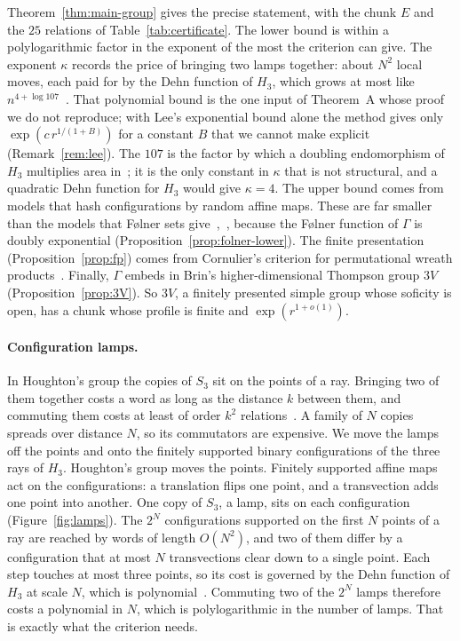 Theorem~\ref{thm:main-group} gives the precise statement, with the chunk $E$ and the $25$ relations of Table~\ref{tab:certificate}. The lower
bound is within a polylogarithmic factor in the exponent of the most the criterion can give. The exponent $\kappa$ records the price of bringing
two lamps together: about $N^2$ local moves, each paid for by the Dehn function of $H_3$, which grows at most like $n^{4+\log107}$~\cite[Theorems~3.2 and~3.3]{DouglasMghirbiA}. That
polynomial bound is the one input of Theorem~A whose proof we do not reproduce; with Lee's exponential bound alone the method gives only
$\exp(c\,r^{1/(1+B)})$ for a constant $B$ that we cannot make explicit (Remark~\ref{rem:lee}). The $107$ is
the factor by which a doubling endomorphism of $H_3$ multiplies area in~\cite[Section~3]{DouglasMghirbiA}; it is the only constant in $\kappa$
that is not structural, and a quadratic Dehn function for $H_3$ would give $\kappa=4$. The upper bound comes from models that hash
configurations by random affine maps. These are far smaller than the models that Følner sets give~\cite[Proposition~3.14]{Cornulier2013},~\cite[Section~4.3]{ArzhantsevaCherix2024},
because the Følner function of $\Gamma$ is doubly exponential (Proposition~\ref{prop:folner-lower}). The finite presentation
(Proposition~\ref{prop:fp}) comes from Cornulier's criterion for permutational wreath products~\cite[Theorem~1.1]{Cornulier2006}. Finally,
$\Gamma$ embeds in Brin's higher-dimensional Thompson group $3V$ (Proposition~\ref{prop:3V}). So $3V$, a finitely presented simple group whose
soficity is open, has a chunk whose profile is finite and $\exp(r^{1+o(1)})$.

\paragraph{Configuration lamps.} In Houghton's group the copies of $S_3$ sit on the points of a ray. Bringing two of them together costs a
word as long as the distance $k$ between them, and commuting them costs at least of order $k^2$ relations~\cite[Proposition~3.4]{DouglasMghirbiA}.
A family of $N$ copies spreads over distance $N$, so its commutators are expensive. We move the lamps off the points and onto the finitely
supported binary configurations of the three rays of $H_3$. Houghton's group moves the points. Finitely supported affine maps act on the
configurations: a translation flips one point, and a transvection adds one point into another. One copy of $S_3$, a lamp, sits on each
configuration (Figure~\ref{fig:lamps}). The $2^N$ configurations supported on the first $N$ points of a ray are reached by words of length
$O(N^2)$, and two of them differ by a configuration that at most $N$ transvections clear down to a single point. Each step touches at most
three points, so its cost is governed by the Dehn function of $H_3$ at scale $N$, which is polynomial~\cite[Theorems~3.2 and~3.3]{DouglasMghirbiA}.
Commuting two of the $2^N$ lamps therefore costs a polynomial in $N$, which is polylogarithmic in the number of lamps. That is exactly what the
criterion needs.

